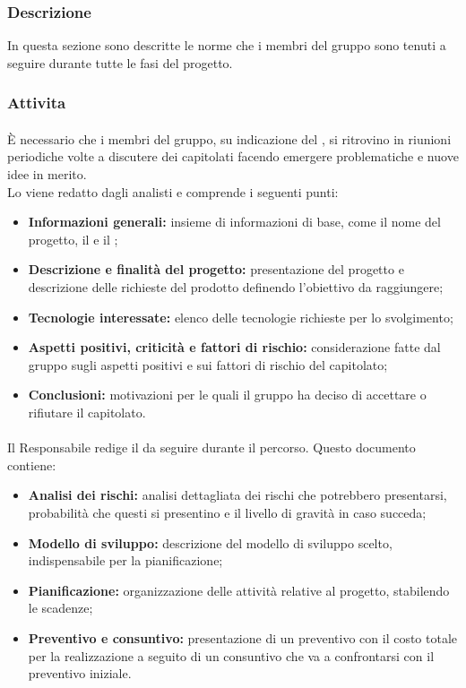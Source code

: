 \subsubsection{Descrizione}
In questa sezione sono descritte le norme che i membri del gruppo \Omicron sono tenuti a seguire durante tutte le fasi del progetto.
\subsubsection{Attivita}
\paragraph{\SdF}
È necessario che i membri del gruppo, su indicazione del \respProg,  si ritrovino in riunioni periodiche volte a discutere dei capitolati facendo emergere problematiche e nuove idee in merito.\\
Lo \SdFv viene redatto dagli analisti e comprende i seguenti punti:
\begin{itemize}
    \item \textbf{Informazioni generali:} insieme di informazioni di base, come il nome del progetto, il \proponProg e il \commitProg;
    \item \textbf{Descrizione e finalità del progetto:} presentazione del progetto e descrizione delle richieste del prodotto definendo l'obiettivo da raggiungere;
    \item \textbf{Tecnologie interessate:} elenco delle tecnologie richieste per lo svolgimento;
    \item \textbf{Aspetti positivi, criticità e fattori di rischio:} considerazione fatte dal gruppo sugli aspetti positivi e sui fattori di rischio del capitolato;
    \item \textbf{Conclusioni:} motivazioni per le quali il gruppo ha deciso di accettare o rifiutare il capitolato.
\end{itemize}
\paragraph{\PdP} Il Responsabile redige il \PdPv da seguire durante il percorso. Questo documento contiene:
\begin{itemize}
    \item \textbf{Analisi dei rischi:} analisi dettagliata dei rischi che potrebbero presentarsi, probabilità che questi si presentino e il livello di gravità in caso succeda;
    
    \item \textbf{Modello di sviluppo:} descrizione del modello di sviluppo scelto, indispensabile per la pianificazione;
    
    \item \textbf{Pianificazione:} organizzazione delle attività relative al progetto, stabilendo le scadenze;
    
    \item \textbf{Preventivo e consuntivo:} presentazione di un preventivo con il costo totale per la realizzazione a seguito di un consuntivo che va a confrontarsi con il preventivo iniziale.
\end{itemize}

